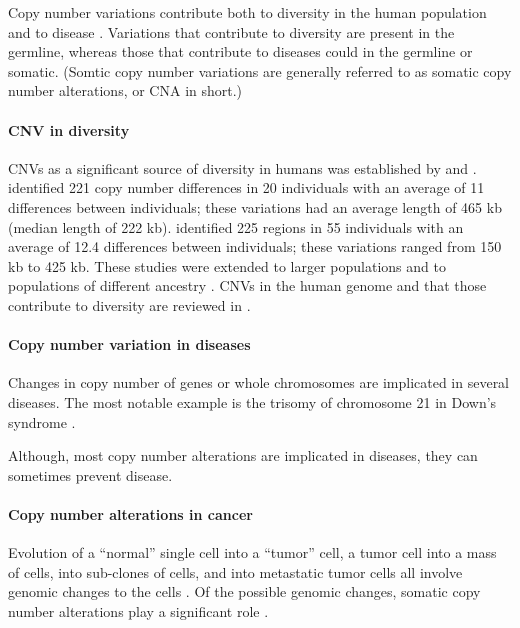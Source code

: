Copy number variations contribute both to diversity in the human
population and to disease \citep{}.
Variations that contribute to diversity are present in the germline,
whereas those that contribute to diseases could in the germline or
somatic. (Somtic copy number variations are generally referred to as
somatic copy number alterations, or CNA in short.)

\paragraph{CNV in diversity}
CNVs as a significant source of diversity in humans was established by
\cite{sebat2004large} and \cite{iafrate2004detection}.
%
\cite{sebat2004large} identified 221 copy number differences in 20
individuals with an average of 11 differences between individuals; these
variations had an average length of 465 kb (median length of 222 kb).
%
\cite{iafrate2004detection} identified 225 regions in 55 individuals
with an average of 12.4 differences between individuals; these
variations ranged from 150 kb to 425 kb.
%
These studies were extended to larger populations and to populations of
different ancestry \citep{redon2006global,li2009whole}.  CNVs in the
human genome and that those contribute to diversity are reviewed in
\citep{freeman2006copy,feuk2006structural,zarrei2015copy}.

\paragraph{Copy number variation in diseases}
Changes in copy number of genes or whole chromosomes are implicated in
several diseases. The most notable example is the trisomy of chromosome
21 in Down's syndrome \citep{}.

Although, most copy number alterations are implicated in diseases, they
can sometimes prevent disease.

\paragraph{Copy number alterations in cancer}
Evolution of a ``normal'' single cell into a ``tumor'' cell, a tumor
cell into a mass of cells, into sub-clones of cells, and into metastatic
tumor cells all involve genomic changes to the cells
\citep{stratton2009cancer}. Of the possible genomic changes, somatic copy
number alterations play a significant role
\citep{beroukhim2010landscape,zack2013pan}.

